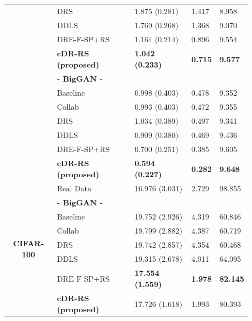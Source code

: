 \documentclass[final,12pt, 3p,times]{elsarticle}
\begin{document}
\begin{table}[htbp]
\begin{adjustbox}{width=0.5\textwidth}
\begin{tabular}{rllll}
			\multicolumn{1}{c}{} & DRS \cite{azadi2018discriminator}  & 1.875 (0.281) & 1.417 & 8.958\\
			\multicolumn{1}{c}{} & DDLS \cite{che2020your}  & 1.769 (0.268) & 1.368 & 9.070 \\
			\multicolumn{1}{c}{} & DRE-F-SP+RS \cite{ding2020subsampling} & 1.164 (0.214) & 0.896 & 9.554 \\
			\multicolumn{1}{c}{} & \textbf{cDR-RS (proposed)} & \textbf{1.042 (0.233)} & \textbf{0.715} & \textbf{9.577} \\
			\cline{2-5}
			\multicolumn{1}{c}{} & \textbf{- BigGAN -} &       &       &  \\
			\multicolumn{1}{c}{} & Baseline & 0.998 (0.403) & 0.478 & 9.352 \\
			\multicolumn{1}{c}{} & Collab \cite{liu2020collaborative} & 0.993 (0.403) & 0.472 & 9.355 \\
			\multicolumn{1}{c}{} & DRS \cite{azadi2018discriminator}  & 1.034 (0.389) & 0.497 & 9.341 \\
			\multicolumn{1}{c}{} & DDLS \cite{che2020your} & 0.909 (0.380) & 0.469 & 9.436 \\
			\multicolumn{1}{c}{} & DRE-F-SP+RS \cite{ding2020subsampling} & 0.700 (0.251) & 0.385 & 9.605 \\
			\multicolumn{1}{c}{} & \textbf{cDR-RS (proposed)} & \textbf{0.594 (0.227)} & \textbf{0.282} & \textbf{9.648} \\
			
			\midrule
			
			\multicolumn{1}{c}{\multirow{9}[0]{*}{\begin{sideways}\textbf{CIFAR-100}\end{sideways}}} & Real Data & 16.976 (3.031) & 2.729 & 98.855 \\
			\cline{2-5}
			\multicolumn{1}{c}{} & \textbf{- BigGAN -} &       &       &  \\
			\multicolumn{1}{c}{} & Baseline & 19.752 (2.926) & 4.319 & 60.846 \\
			\multicolumn{1}{c}{} & Collab \cite{liu2020collaborative} & 19.799 (2.882) & 4.387 & 60.719 \\
			\multicolumn{1}{c}{} & DRS \cite{azadi2018discriminator}  & 19.742 (2.857) & 4.354 & 60.468 \\
			\multicolumn{1}{c}{} & DDLS \cite{che2020your} & 19.315 (2.678) & 4.011 & 64.095 \\
			\multicolumn{1}{c}{} & DRE-F-SP+RS \cite{ding2020subsampling} & \textbf{17.554 (1.559)} & \textbf{1.978} & \textbf{82.145} \\
			\multicolumn{1}{c}{} & \textbf{cDR-RS (proposed)} & 17.726 (1.618) & 1.993 & 80.393 \\
			

\end{tabular}
\end{adjustbox}
\end{table}
\end{document}
